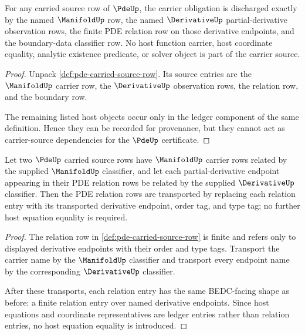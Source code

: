 \begin{theorem}\label{thm:pde-carrier-source-obligation}
For any carried source row of $\PdeUp$, the carrier obligation is discharged exactly by the named $\ManifoldUp$ row, the named $\DerivativeUp$ partial-derivative observation rows, the finite PDE relation row on those derivative endpoints, and the boundary-data classifier row. No host function carrier, host coordinate equality, analytic existence predicate, or solver object is part of the carrier source.
\end{theorem}
\begin{proof}
Unpack \autoref{def:pde-carried-source-row}. Its source entries are the $\ManifoldUp$ carrier row, the $\DerivativeUp$ observation rows, the relation row, and the boundary row.

The remaining listed host objects occur only in the ledger component of the same definition. Hence they can be recorded for provenance, but they cannot act as carrier-source dependencies for the $\PdeUp$ certificate.
\end{proof}

\begin{theorem}\label{thm:pde-relation-classifier-obligation}
Let two $\PdeUp$ carried source rows have $\ManifoldUp$ carrier rows related by the supplied $\ManifoldUp$ classifier, and let each partial-derivative endpoint appearing in their PDE relation rows be related by the supplied $\DerivativeUp$ classifier. Then the PDE relation rows are transported by replacing each relation entry with its transported derivative endpoint, order tag, and type tag; no further host equation equality is required.
\end{theorem}
\begin{proof}
The relation row in \autoref{def:pde-carried-source-row} is finite and refers only to displayed derivative endpoints with their order and type tags. Transport the carrier name by the $\ManifoldUp$ classifier and transport every endpoint name by the corresponding $\DerivativeUp$ classifier.

After these transports, each relation entry has the same BEDC-facing shape as before: a finite relation entry over named derivative endpoints. Since host equations and coordinate representatives are ledger entries rather than relation entries, no host equation equality is introduced.
\end{proof}


